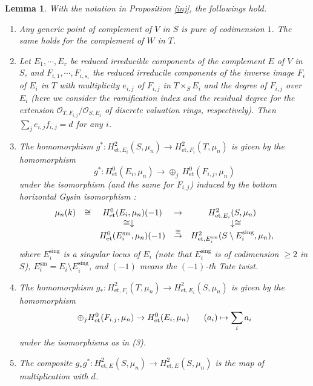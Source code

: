 \documentclass[11pt]{amsart}
\newtheorem{lemma}[Lemma]{Lemma}
\begin{document}
\begin{lemma}\label{sure} With the notation in Proposition \ref{inj}, the followings hold.  
\begin{enumerate}
\item Any generic point of complement of $V$ in $S$ is pure of codimension $1$. 
The same holds for the complement of $W$ in $T$. 
\item Let $E_1, \cdots, E_r$ be reduced irreducible components of the complement $E$ of $V$ in $S$, 
and $F_{i,1}, \cdots, F_{i,s_i}$ the reduced irreducile components of the inverse image $F_i$ of $E_i$ in  $T$ 
with multiplicity $e_{i, j}$ of $F_{i, j}$ in $T \times_S E_i$ and the degree of $F_{i, j}$ over $E_i$ (here we consider 
the ramification index and the residual degree for the extension $\mathcal O_{T, F_{i, j}}/\mathcal O_{S, E_i}$ 
of discrete valuation rings, respectively). Then $\sum_j e_{i, j}f_{i, j} = d$ for any $i$.
\item The homomorphism 
$g^\ast : H_{\mathrm{et}, E_i}^2(S, \mu_n) \rightarrow H_{\mathrm{et}, F_i}^2(T, \mu_n)$ 
is given by the homomorphism 
$$
       g^\ast : H_{\mathrm{et}}^0(E_i, \mu_n) \rightarrow \oplus_j\, H_{\mathrm{et}}^0(F_{i, j}, \mu_n) 
$$
under the isomorphism (and the same for $F_{i, j}$) induced by the bottom horizontal 
Gysin isomorphism \cite[VI, Theorem 5.1]{mil}:
$$
      \begin{array}{ccccc}
          \mu_n(k) &\cong &H_{\mathrm{et}}^0(E_i, \mu_n)(-1) &\rightarrow &H_{\mathrm{et}, E_i}^2(S, \mu_n) \\
          &&\cong \downarrow \hspace*{3mm} & &\hspace*{3mm} \downarrow \cong \\
          &&H_{\mathrm{et}}^0(E_i^{\mathrm{sm}}, \mu_n)(-1)&\overset{\cong}{\rightarrow} 
          &H_{\mathrm{et}, E_i^{\mathrm{sm}}}^2(S \setminus E_i^{\mathrm{sing}}, \mu_n), 
      \end{array}
$$
where $E_i^{\mathrm{sing}}$ is a singular locus of $E_i$ (note that $E_i^{\mathrm{sing}}$ is of codimension $\geq 2$ in $S$), 
$E_i^{\mathrm{sm}} = E_i \setminus E_i^{\mathrm{sing}}$, 
and $(-1)$ means the $(-1)$-th Tate twist. 
\item The homomorphism 
$g_\ast : H_{\mathrm{et}, F_i}^2(T, \mu_n) \rightarrow H_{\mathrm{et}, E_i}^2(S, \mu_n)$ 
is given by the homomorphism 
$$
       \oplus_jH_{\mathrm{et}}^0(F_{i, j}, \mu_n) \rightarrow H_{\mathrm{et}}^0(E_i, \mu_n) 
       \hspace*{6mm} (a_i) \mapsto \sum_i a_i 
$$
under the isomorphisms as in (3). 
\item The composite $g_\ast g^\ast : H_{\mathrm{et}, E}^2(S, \mu_n) \rightarrow 
H_{\mathrm{et}, E}^2(S, \mu_n)$ is the map of multiplication with $d$. 
\end{enumerate}
\end{lemma} 
\end{document}

